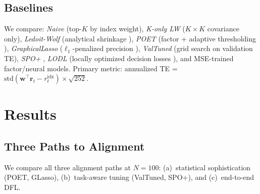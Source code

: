 \documentclass[letterpaper]{article}
\newcommand{\bw}{\mathbf{w}}
\newcommand{\br}{\mathbf{r}}
\begin{document}
\subsection{Baselines}

We compare: \emph{Naive} (top-$K$ by index weight), \emph{K-only LW} ($K{\times}K$ covariance only), \emph{Ledoit-Wolf} (analytical shrinkage \citep{ledoit2004well}), \emph{POET} (factor + adaptive thresholding \citep{fan2013large}), \emph{GraphicalLasso} ($\ell_1$-penalized precision \citep{friedman2008sparse}), \emph{ValTuned} (grid search on validation TE), \emph{SPO+} \citep{elmachtoub2022smart}, \emph{LODL} (locally optimized decision losses \citep{shah2022decision}), and MSE-trained factor/neural models. Primary metric: annualized TE = $\text{std}(\bw^\top \br_t - r_t^{\text{idx}}) \times \sqrt{252}$.

\section{Results}

\subsection{Three Paths to Alignment}

We compare all three alignment paths at $N{=}100$: (a)~statistical sophistication (POET, GLasso), (b)~task-aware tuning (ValTuned, SPO+), and (c)~end-to-end DFL.

\begin{table}[t]
\centering
\caption{Three paths at $N{=}100$ across sparsity levels. All task-aligned methods outperform LW yet are mutually equivalent (TOST: all 10 pairs equivalent at $\delta{=}15$~bps, $p < 0.04$; max $|d| = 0.57$ at $K{=}20$).}
\label{tab:exp3}
\footnotesize
{}
\end{table}
\end{document}
